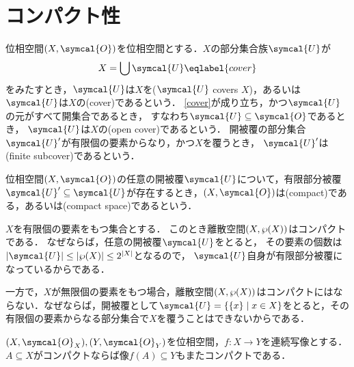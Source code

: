 \documentclass{ltjsbook}
\begin{document}
\section{コンパクト性}
\begin{thmbox}
\begin{definition}
    位相空間\(\tuple{X, \symcal{O}}\)を位相空間とする．\(X\)の部分集合族\(\symcal{U}\)が
\begin{align}
    X = \bigcup \symcal{U}
    \eqlabel{cover}
\end{align}
をみたすとき，\(\symcal{U}\)は\(X\)を(\(\symcal{U}\) covers \(X\))，あるいは
\(\symcal{U}\)は\(X\)の(cover)であるという．
\eqref{cover}が成り立ち，かつ\(\symcal{U}\)の元がすべて開集合であるとき，
すなわち\(\symcal{U} \subseteq \symcal{O}\)であるとき，
\(\symcal{U}\)は\(X\)の(open cover)であるという．
開被覆の部分集合\(\symcal{U}'\)が有限個の要素からなり，かつ\(X\)を覆うとき，
\(\symcal{U}'\)は(finite subcover)であるという．

位相空間\(\tuple{X, \symcal{O}}\)の任意の開被覆\(\symcal{U}\)について，有限部分被覆\(\symcal{U}' \subseteq \symcal{U}\)が存在するとき，\(\tuple{X, \symcal{O}}\)は(compact)である，あるいは(compact space)であるという．
\end{definition}
\end{thmbox}

\begin{exa} \(X\)を有限個の要素をもつ集合とする．
このとき離散空間\((X, \wp(X))\)はコンパクトである．
なぜならば，任意の開被覆\(\symcal{U}\)をとると，
その要素の個数は\(\lvert\symcal{U}\rvert \leq \lvert \wp(X)\rvert \leq 2^{\lvert X \rvert}\)となるので，
\(\symcal{U}\)自身が有限部分被覆になっているからである．

一方で，\(X\)が無限個の要素をもつ場合，離散空間\((X, \wp(X))\)はコンパクトにはならない．なぜならば，開被覆として\(\symcal{U} = \{\{x\} \mid x \in X\}\)をとると，その有限個の要素からなる部分集合で\(X\)を覆うことはできないからである．
\end{exa}


\begin{thmbox}
\begin{theorem}
\(\tuple{X, \symcal{O}_X}, \tuple{Y, \symcal{O}_Y}\)を位相空間，\(f\colon X \to Y\)を連続写像とする．
\(A \subseteq X\)がコンパクトならば像\(f(A) \subseteq Y\)もまたコンパクトである．
\end{theorem}
\end{thmbox}
\end{document}
